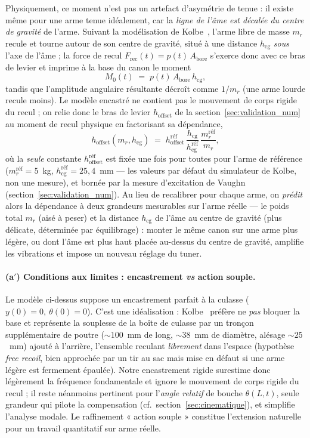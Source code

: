 \documentclass[12pt,a4paper]{article}
\begin{document}
	Physiquement, ce moment n'est pas un artefact d'asymétrie de tenue : il existe même pour une arme tenue idéalement, car la \emph{ligne de l'âme est décalée du centre de gravité} de l'arme. Suivant la modélisation de Kolbe~\cite{KolbeSim}, l'arme libre de masse $m_r$ recule et tourne autour de son centre de gravité, situé à une distance $h_\text{cg}$ \emph{sous} l'axe de l'âme ; la force de recul $F_\text{rec}(t) = p(t)\,A_\text{bore}$ s'exerce donc avec ce bras de levier et imprime à la base du canon le moment
	\begin{equation}
		\label{eq:moment_recul}
		M_0(t) \;=\; p(t)\,A_\text{bore}\,h_\text{cg},
	\end{equation}
	tandis que l'amplitude angulaire résultante décroît comme $1/m_r$ (une arme lourde recule moins). Le modèle encastré ne contient pas le mouvement de corps rigide du recul ; on relie donc le bras de levier $h_\text{offset}$ de la section~\ref{sec:validation_num} au moment de recul physique en factorisant sa dépendance,
	\begin{equation}
		\label{eq:hoffset_phys}
		h_\text{offset}(m_r, h_\text{cg}) \;=\; h_\text{offset}^\text{réf}\,\frac{h_\text{cg}}{h_\text{cg}^\text{réf}}\,\frac{m_r^\text{réf}}{m_r},
	\end{equation}
	où la \emph{seule} constante $h_\text{offset}^\text{réf}$ est fixée une fois pour toutes pour l'arme de référence ($m_r^\text{réf} = 5$~kg, $h_\text{cg}^\text{réf} = 25{,}4$~mm --- les valeurs par défaut du simulateur de Kolbe, non une mesure), et bornée par la mesure d'excitation de Vaughn~\cite{Vaughn} (section~\ref{sec:validation_num}). Au lieu de recalibrer pour chaque arme, on \emph{prédit} alors la dépendance à deux grandeurs mesurables sur l'arme réelle — le poids total $m_r$ (aisé à peser) et la distance $h_\text{cg}$ de l'âme au centre de gravité (plus délicate, déterminée par équilibrage) : monter le même canon sur une arme plus légère, ou dont l'âme est plus haut placée au-dessus du centre de gravité, amplifie les vibrations et impose un nouveau réglage du tuner.

	\paragraph{(a$'$) Conditions aux limites : encastrement \emph{vs} action souple.} Le modèle ci-dessus suppose un encastrement parfait à la culasse ($y(0)=0,\ \theta(0)=0$). C'est une idéalisation : Kolbe~\cite{KolbeSim} préfère ne \emph{pas} bloquer la base et représente la souplesse de la boîte de culasse par un tronçon supplémentaire de poutre ($\sim 100$~mm de long, $\sim 38$~mm de diamètre, alésage $\sim 25$~mm) ajouté à l'arrière, l'ensemble reculant \emph{librement} dans l'espace (hypothèse \emph{free recoil}, bien approchée par un tir au sac mais mise en défaut si une arme légère est fermement épaulée). Notre encastrement rigide surestime donc légèrement la fréquence fondamentale et ignore le mouvement de corps rigide du recul ; il reste néanmoins pertinent pour l'\emph{angle relatif} de bouche $\theta(L,t)$, seule grandeur qui pilote la compensation (cf.\ section~\ref{sec:cinematique}), et simplifie l'analyse modale. Le raffinement « action souple » constitue l'extension naturelle pour un travail quantitatif sur arme réelle.
\end{document}
